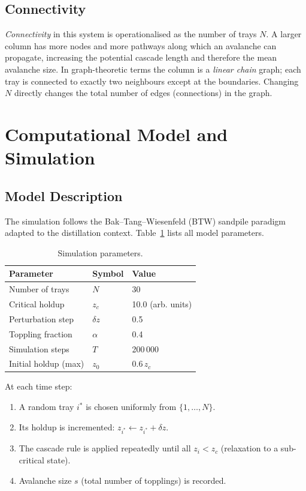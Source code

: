 \documentclass[twocolumn,12pt]{article}
\begin{document}
\subsection{Connectivity}

\textit{Connectivity} in this system is operationalised as the number of
trays $N$.  A larger column has more nodes and more pathways along which an
avalanche can propagate, increasing the potential cascade length and therefore
the mean avalanche size.  In graph-theoretic terms the column is a
\textit{linear chain} graph; each tray is connected to exactly two neighbours
except at the boundaries.  Changing $N$ directly changes the total number of
edges (connections) in the graph.

\section{Computational Model and Simulation}

\subsection{Model Description}

The simulation follows the Bak--Tang--Wiesenfeld (BTW) sandpile
paradigm~\cite{Bak1987} adapted to the distillation context.  Table~\ref{tab:params}
lists all model parameters.

\begin{table}[H]
  \centering
  \caption{Simulation parameters.}
  \label{tab:params}
  \begin{tabular}{lll}
    \toprule
    Parameter & Symbol & Value \\
    \midrule
    Number of trays       & $N$        & 30         \\
    Critical holdup       & $z_c$      & 10.0 (arb. units) \\
    Perturbation step     & $\delta z$ & 0.5        \\
    Toppling fraction     & $\alpha$   & 0.4        \\
    Simulation steps      & $T$        & 200\,000   \\
    Initial holdup (max)  & $z_0$      & $0.6\,z_c$ \\
    \bottomrule
  \end{tabular}
\end{table}

At each time step:
\begin{enumerate}
  \item A random tray $i^*$ is chosen uniformly from $\{1,\ldots,N\}$.
  \item Its holdup is incremented: $z_{i^*} \leftarrow z_{i^*} + \delta z$.
  \item The cascade rule is applied repeatedly until all $z_i < z_c$
        (relaxation to a sub-critical state).
  \item Avalanche size $s$ (total number of topplings) is recorded.
\end{enumerate}
\end{document}
